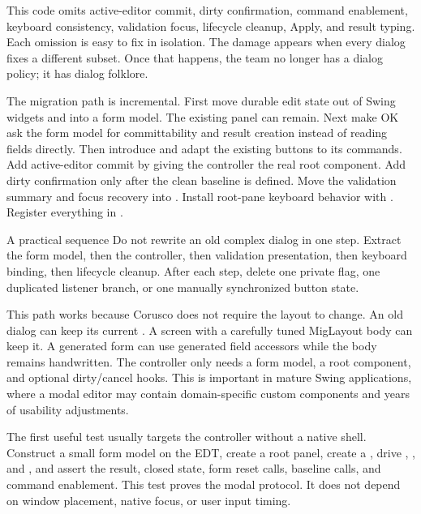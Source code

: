 This code omits active-editor commit, dirty confirmation, command enablement,
keyboard consistency, validation focus, lifecycle cleanup, Apply, and result
typing. Each omission is easy to fix in isolation. The damage appears when
every dialog fixes a different subset. Once that happens, the team no longer
has a dialog policy; it has dialog folklore.

The migration path is incremental. First move durable edit state out of Swing
widgets and into a form model. The existing panel can remain. Next make OK ask
the form model for committability and result creation instead of reading fields
directly. Then introduce  and adapt the existing buttons to
its commands. Add active-editor commit by giving the controller the real root
component. Add dirty confirmation only after the clean baseline is defined.
Move the validation summary and focus recovery into
. Install root-pane keyboard behavior with
. Register everything in
.

\begin{migrationbox}{A practical sequence}
Do not rewrite an old complex dialog in one step. Extract the form model, then
the controller, then validation presentation, then keyboard binding, then
lifecycle cleanup. After each step, delete one private flag, one duplicated
listener branch, or one manually synchronized button state.
\end{migrationbox}

This path works because Corusco does not require the layout to change. An old
dialog can keep its current . A screen with a carefully tuned
MigLayout body can keep it. A generated form can use generated field accessors
while the body remains handwritten. The controller only needs a form model, a
root component, and optional dirty/cancel hooks. This is important in mature
Swing applications, where a modal editor may contain domain-specific custom
components and years of usability adjustments.

The first useful test usually targets the controller without a native shell.
Construct a small form model on the EDT, create a root panel, create a
, drive , , and , and assert
the result, closed state, form reset calls, baseline calls, and command
enablement. This test proves the modal protocol. It does not depend on window
placement, native focus, or user input timing.

